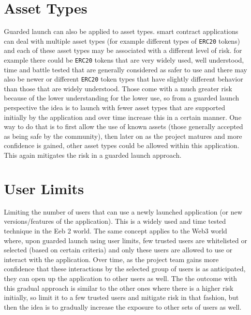 \section{Asset Types}
Guarded launch can also be applied to asset types. smart contract applications can deal with multiple asset types (for example different types of \verb|ERC20| tokens) and each of these asset types may be associated with a different level of risk. for example there could be \verb|ERC20| tokens that are very widely used, well understood, time and battle tested that are generally considered as safer to use and there may also be newer or different \verb|ERC20| token types that have slightly different behavior than those that are widely understood. Those come with a much greater risk because of the lower understanding for the lower use, so from a guarded launch perspective the idea is to launch with fewer asset types that are supported initially by the application and over time increase this in a certain manner. One way to do that is to first allow the use of known assets (those generally accepted as being safe by the community), then later on as the project matures and more confidence is gained, other asset types could be allowed within this application. This again mitigates the risk in a guarded launch approach.

\section{User Limits}
Limiting the number of users that can use a newly launched application (or new versions/features of the application). This is a widely used and time tested technique in the Eeb 2 world. The same concept applies to the Web3 world where, upon guarded launch using user limits, few trusted users are whitelisted or selected (based on certain criteria) and only these users are allowed to use or interact with the application. Over time, as the project team gains more confidence that these interactions by the selected group of users is as anticipated, they can open up the application to other users as well. The the outcome with this gradual approach is similar to the other ones where there is a higher risk initially, so limit it to a few trusted users and mitigate risk in that fashion, but then the idea is to gradually increase the exposure to other sets of users as well.

